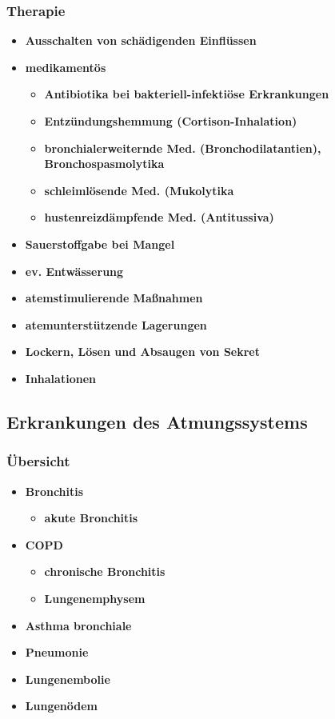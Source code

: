 	\subsubsection{Therapie}
		\begin{itemize}
			\item \textbf{Ausschalten von schädigenden Einflüssen}
			\item \textbf{medikamentös}
				\begin{itemize}
					\item \textbf{Antibiotika bei bakteriell-infektiöse Erkrankungen}
					\item \textbf{Entzündungshemmung (Cortison-Inhalation)}
					\item \textbf{bronchialerweiternde Med. (Bronchodilatantien), Bronchospasmolytika}
					\item \textbf{schleimlösende Med. (Mukolytika}
					\item \textbf{hustenreizdämpfende Med. (Antitussiva)}
				\end{itemize}
			\item \textbf{Sauerstoffgabe bei Mangel}
			\item \textbf{ev. Entwässerung}
			\item \textbf{atemstimulierende Maßnahmen}
			\item \textbf{atemunterstützende Lagerungen}
			\item \textbf{Lockern, Lösen und Absaugen von Sekret}
			\item \textbf{Inhalationen}
		\end{itemize}
		
\subsection{Erkrankungen des Atmungssystems}
	\subsubsection{Übersicht}
		\begin{itemize}
			\item \textbf{Bronchitis}
				\begin{itemize}
					\item \textbf{akute Bronchitis}
				\end{itemize}
			\item \textbf{COPD}
				\begin{itemize}
					\item \textbf{chronische Bronchitis}
					\item \textbf{Lungenemphysem}
				\end{itemize}
			\item \textbf{Asthma bronchiale}
			\item \textbf{Pneumonie}
			\item \textbf{Lungenembolie}
			\item \textbf{Lungenödem}
		\end{itemize}
